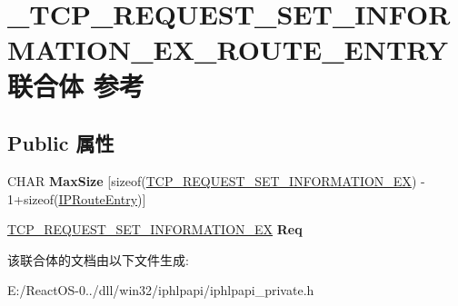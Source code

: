 \hypertarget{union___t_c_p___r_e_q_u_e_s_t___s_e_t___i_n_f_o_r_m_a_t_i_o_n___e_x___r_o_u_t_e___e_n_t_r_y}{}\section{\+\_\+\+T\+C\+P\+\_\+\+R\+E\+Q\+U\+E\+S\+T\+\_\+\+S\+E\+T\+\_\+\+I\+N\+F\+O\+R\+M\+A\+T\+I\+O\+N\+\_\+\+E\+X\+\_\+\+R\+O\+U\+T\+E\+\_\+\+E\+N\+T\+R\+Y联合体 参考}
\label{union___t_c_p___r_e_q_u_e_s_t___s_e_t___i_n_f_o_r_m_a_t_i_o_n___e_x___r_o_u_t_e___e_n_t_r_y}
\subsection*{Public 属性}
\begin{DoxyCompactItemize}
\item 
\mbox{\label{union___t_c_p___r_e_q_u_e_s_t___s_e_t___i_n_f_o_r_m_a_t_i_o_n___e_x___r_o_u_t_e___e_n_t_r_y_a4e6427d5f55995634b862168ec7b01da}} 
C\+H\+AR {\bfseries Max\+Size} \mbox{[}sizeof(\hyperlink{struct___t_c_p___r_e_q_u_e_s_t___s_e_t___i_n_f_o_r_m_a_t_i_o_n___e_x}{T\+C\+P\+\_\+\+R\+E\+Q\+U\+E\+S\+T\+\_\+\+S\+E\+T\+\_\+\+I\+N\+F\+O\+R\+M\+A\+T\+I\+O\+N\+\_\+\+EX}) -\/ 1+sizeof(\hyperlink{struct___i_p_route_entry}{I\+P\+Route\+Entry})\mbox{]}
\item 
\mbox{\label{union___t_c_p___r_e_q_u_e_s_t___s_e_t___i_n_f_o_r_m_a_t_i_o_n___e_x___r_o_u_t_e___e_n_t_r_y_a694ed019d6ff45f8dd1176b73e43e763}} 
\hyperlink{struct___t_c_p___r_e_q_u_e_s_t___s_e_t___i_n_f_o_r_m_a_t_i_o_n___e_x}{T\+C\+P\+\_\+\+R\+E\+Q\+U\+E\+S\+T\+\_\+\+S\+E\+T\+\_\+\+I\+N\+F\+O\+R\+M\+A\+T\+I\+O\+N\+\_\+\+EX} {\bfseries Req}
\end{DoxyCompactItemize}


该联合体的文档由以下文件生成\+:\begin{DoxyCompactItemize}
\item 
E\+:/\+React\+O\+S-\/0../dll/win32/iphlpapi/iphlpapi\+\_\+private.\+h\end{DoxyCompactItemize}
